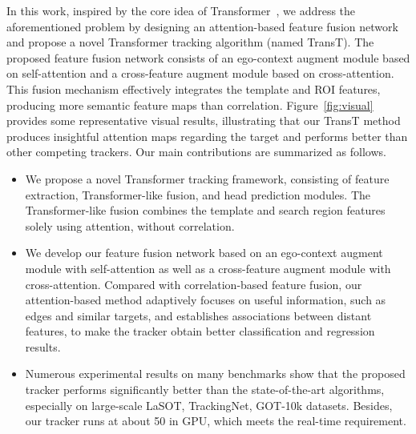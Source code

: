 \documentclass[final]{cvpr}
\begin{document}
In this work, inspired by the core idea of Transformer~\cite{2017Attention}, we address the aforementioned 
problem by designing an attention-based feature fusion network and propose a novel Transformer tracking 
algorithm (named TransT).  
The proposed feature fusion network consists of an ego-context augment module based on self-attention 
and a cross-feature augment module based on cross-attention. 
This fusion mechanism effectively integrates the template and ROI features, producing more semantic 
feature maps than correlation. 
Figure~\ref{fig:visual} provides some representative visual results, illustrating that our TransT method 
produces insightful attention maps regarding the target and performs better than other competing trackers. 
Our main contributions are summarized as follows.

\vspace{-1mm}
\begin{itemize}
    \setlength{\itemsep}{0pt}
    \setlength{\parsep}{0pt}
    \setlength{\parskip}{0pt}
	\item We propose a novel Transformer tracking framework, consisting of feature extraction, Transformer-like fusion, 
	and head prediction modules. The Transformer-like fusion combines the template and search region features 
	solely using attention, without correlation.  
	\item We develop our feature fusion network based on an ego-context augment module with self-attention as 
	well as a cross-feature augment module with cross-attention. Compared with correlation-based feature fusion, 
	our attention-based method adaptively focuses on useful information, such as edges and similar targets, and establishes associations between distant features, 
	to make the tracker obtain better classification and regression results. 
    \item Numerous experimental results on many benchmarks show that the proposed tracker performs significantly better than 
    the state-of-the-art algorithms, especially on large-scale LaSOT, TrackingNet, GOT-10k datasets. Besides, our tracker runs at about 50  in GPU, which meets the real-time requirement. 
\end{itemize} 
\end{document}
